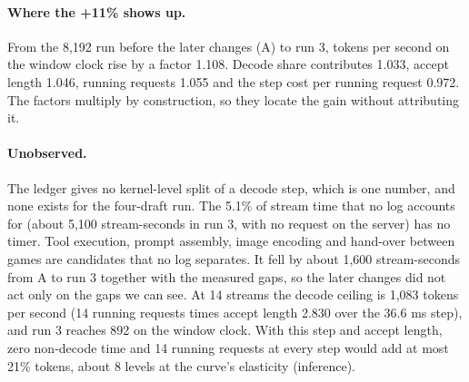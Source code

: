 \paragraph{Where the +11\% shows up.}
From the 8,192 run before the later changes (A) to run 3, tokens per second on the window clock rise by a factor 1.108. Decode share contributes 1.033, accept length 1.046, running requests 1.055 and the step cost per running request 0.972. %
The factors multiply by construction, so they locate the gain without attributing it. %

\paragraph{Unobserved.}
The ledger gives no kernel-level split of a decode step, which is one number, and none exists for the four-draft run.
The 5.1\% of stream time that no log accounts for (about 5,100 stream-seconds in run 3, with no request on the server) has no timer. Tool execution, prompt assembly, image encoding and hand-over between games are candidates that no log separates. It fell by about 1,600 stream-seconds from A to run 3 together with the measured gaps, so the later changes did not act only on the gaps we can see. %
At 14 streams the decode ceiling is 1,083 tokens per second (14 running requests times accept length 2.830 over the 36.6 ms step), and run 3 reaches 892 on the window clock. With this step and accept length, zero non-decode time and 14 running requests at every step would add at most 21\% tokens, about 8 levels at the curve's elasticity (inference). %


